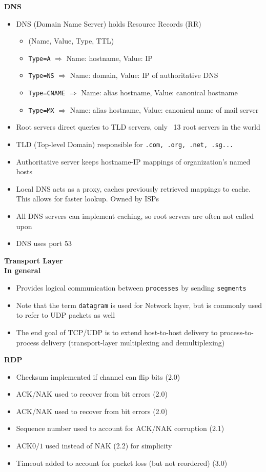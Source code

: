 \documentclass[a4paper]{article} \usepackage[backend=biber, style=numeric, sorting=none]{biblatex}
\begin{document}
\begin{multicols*}{4}
\textbf{DNS}
\begin{itemize}[leftmargin=*]
\item DNS (Domain Name Server) holds Resource Records (RR)
  \begin{itemize}[leftmargin=*]
  \item (Name, Value, Type, TTL)
  \item \texttt{Type=A} $\Rightarrow$ Name: hostname, Value: IP
  \item \texttt{Type=NS} $\Rightarrow$ Name: domain, Value: IP of authoritative DNS
  \item \texttt{Type=CNAME} $\Rightarrow$ Name: alias hostname, Value: canonical hostname
  \item \texttt{Type=MX} $\Rightarrow$ Name: alias hostname, Value: canonical name of mail server
  \end{itemize}
\item Root servers direct queries to TLD servers, only ~13 root servers in the world
\item TLD (Top-level Domain) responsible for \texttt{.com, .org, .net, .sg...}
\item Authoritative server keeps hostname-IP mappings of organization's named hosts
\item Local DNS acts as a proxy, caches previously retrieved mappings to cache. This allows for faster lookup. Owned by ISPs
\item All DNS servers can implement caching, so root servers are often not called upon
\item DNS uses port 53
\end{itemize}

{\small\textbf{Transport Layer}} \\
\textbf{In general}
\begin{itemize}[leftmargin=*]
\item Provides logical communication between \texttt{processes} by sending \texttt{segments}
\item Note that the term \texttt{datagram} is used for Network layer, but is commonly used to refer to UDP packets as well
\item The end goal of TCP/UDP is to extend host-to-host delivery to process-to-process delivery (transport-layer multiplexing and demultiplexing)
\end{itemize}

\textbf{RDP}
\begin{itemize}[leftmargin=*]
\item Checksum implemented if channel can flip bits (2.0)
\item ACK/NAK used to recover from bit errors (2.0)
\item ACK/NAK used to recover from bit errors (2.0)
\item Sequence number used to account for ACK/NAK corruption (2.1)
\item ACK$0/1$ used instead of NAK (2.2) for simplicity
\item Timeout added to account for packet loss (but not reordered) (3.0)
\end{itemize}


\end{multicols*}
\end{document}
